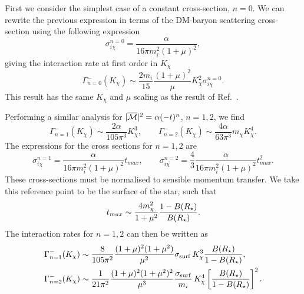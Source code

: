 First we consider the simplest case of a constant cross-section,  $n = 0$.
We can rewrite the previous expression in terms of the DM-baryon scattering cross-section using the following expression
\begin{equation}
\sigma_{i\chi}^{n=0} = \frac{\alpha}{16\pi m_i^2 (1+\mu)^2}, 
\label{app:eq:intraten0}
\end{equation}
giving the interaction rate at first order in $K_\chi$
\begin{equation}
\Gamma_{n=0}^{-}(K_\chi)  \sim \frac{2 m_i}{15}\frac{(1+\mu)^2}{\mu}K_\chi^2 \sigma_{i\chi}^{n=0}.
\end{equation}
This result has the same $K_\chi$ and $\mu$ scaling as the result of Ref.~\cite{Bertoni:2013bsa_dec_DarkMatterThermalization}.



Performing a similar analysis for $|\overline{\mathcal M}|^2=\alpha (-t)^n$, $n=1,2$, 
we find 
\begin{equation}
\Gamma_{n=1}^{-}(K_\chi) 
\sim \frac{2\alpha }{105\pi^3}K_\chi^3,\qquad 
\Gamma_{n=2}^{-}(K_\chi) 
\sim \frac{4\alpha }{63\pi^3}m_\chi K_\chi^4. 
\end{equation}
The expressions for the cross sections for $n=1,2$ are 
\begin{equation}
\sigma^{n=1}_{i\chi} = \frac{\alpha}{16\pi m_i^2(1+\mu)^2}t_{max},\qquad
\sigma^{n=2}_{i\chi} = \frac{4}{3}\frac{\alpha}{16\pi m_i^2(1+\mu)^2}t_{max}^2.   
\end{equation}
These cross-sections must be normalised to sensible momentum transfer. We take this reference point to be the surface of the star, such that 
\begin{equation}
      t_{max} \sim \frac{4m_\chi^2}{1+\mu^2}\frac{1-B(R_\star)}{B(R_\star)}.   
\end{equation}
The interaction rates for $n=1,2$ can then be written as
\begin{align}
    \Gamma_{n=1}^{-}(K_\chi) &\sim \frac{8}{105 \pi^2} \frac{(1+\mu)^2(1+\mu^2)}{\mu^2} \sigma_{\rm surf} \, K_\chi^3 \frac{B(R_\star)}{1-B(R_\star)}, \label{app:eq:intraten1}\\
\Gamma_{n=2}^{-}(K_\chi) &\sim \frac{1}{21 \pi^2} \frac{(1+\mu)^2(1+\mu^2)^2}{\mu^3} \frac{\sigma_{\rm surf}}{m_i} \, K_\chi^4\left[\frac{B(R_\star)}{1-B(R_\star)}\right]^2.
\label{app:eq:intraten2}
\end{align}


